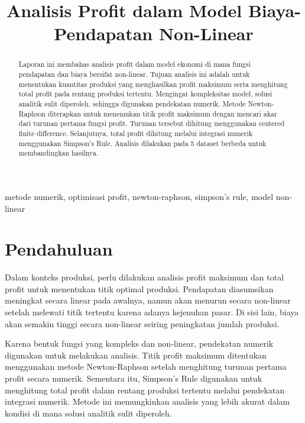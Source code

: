 \documentclass[conference]{IEEEtran}
\begin{document}
\title{Analisis Profit dalam Model Biaya-Pendapatan Non-Linear}

\author{
}

\maketitle

\begin{abstract}
Laporan ini membahas analisis profit dalam model ekonomi di mana fungsi pendapatan dan biaya bersifat non-linear. Tujuan analisis ini adalah untuk menentukan kuantitas produksi yang menghasilkan profit maksimum serta menghitung total profit pada rentang produksi tertentu. Mengingat kompleksitas model, solusi analitik sulit diperoleh, sehingga digunakan pendekatan numerik. Metode Newton-Raphson diterapkan untuk menemukan titik profit maksimum dengan mencari akar dari turunan pertama fungsi profit. Turunan tersebut dihitung menggunakan centered finite difference. Selanjutnya, total profit dihitung melalui integrasi numerik menggunakan Simpson's Rule. Analisis dilakukan pada 5 dataset berbeda untuk membandingkan hasilnya.
\end{abstract}

\begin{IEEEkeywords}
metode numerik, optimisasi profit, newton-raphson, simpson's rule, model non-linear
\end{IEEEkeywords}

\section{Pendahuluan}
Dalam konteks produksi, perlu dilakukan analisis profit maksimum dan total profit untuk menentukan titik optimal produksi. Pendapatan diasumsikan meningkat secara linear pada awalnya, namun akan menurun secara non-linear setelah melewati titik tertentu karena adanya kejenuhan pasar. Di sisi lain, biaya akan semakin tinggi secara non-linear seiring peningkatan jumlah produksi. 

Karena bentuk fungsi yang kompleks dan non-linear, pendekatan numerik digunakan untuk melakukan analisis. Titik profit maksimum ditentukan menggunakan metode Newton-Raphson setelah menghitung turunan pertama profit secara numerik. Sementara itu, Simpson’s Rule digunakan untuk menghitung total profit dalam rentang produksi tertentu melalui pendekatan integrasi numerik. Metode ini memungkinkan analisis yang lebih akurat dalam kondisi di mana solusi analitik sulit diperoleh.
\end{document}
